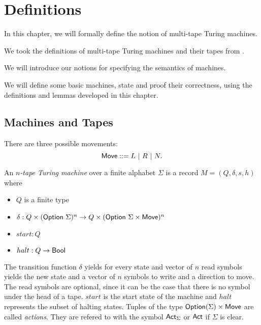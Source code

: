 \chapter{Definitions}
\label{chap:definitions}

In this chapter, we will formally define the notion of multi-tape Turing machines.

We took the definitions of multi-tape Turing machines and their tapes from \cite{asperti2015}.

We will introduce our notions for specifying the semantics of machines.

We will define some basic machines, state and proof their correctness, using the definitions and lemmas developed in this chapter.

\section{Machines and Tapes}
\label{sec:machine_tapes}


\begin{definition}[Movement]
  \label{def:movement}
  There are three possible movements:
  $$\textsf{Move} ::= L ~|~ R ~|~ N.$$
\end{definition}


\begin{definition}
  \label{def:mTM}
  An \emph{$n$-tape Turing machine} over a finite alphabet $\Sigma$ is a record $M = (Q, \delta, s, h)$ where
  \begin{itemize}
  \item $Q$ is a finite type
  \item $\delta : Q \times (\textsf{Option}~\Sigma)^n \rightarrow Q \times (\textsf{Option}~\Sigma \times \textsf{Move})^n$
  \item $start:Q$
  \item $halt : Q \rightarrow \textsf{Bool}$ 
  \end{itemize}

\end{definition}

The transition function $\delta$ yields for every state and vector of $n$ read symbols yields the new state and a vector of $n$ symbols to write and a
direction to move.  The read symbols are optional, since it can be the case that there is no symbol under the head of a tape. $start$ is the start state
of the machine and $halt$ represents the subset of halting states.  Tuples of the type $\textsf{Option}(\Sigma) \times \textsf{Move}$ are called \emph{actions}.  They
are refered to with the symbol $\textsf{Act}_\Sigma$ or $\textsf{Act}$ if $\Sigma$ is clear.

